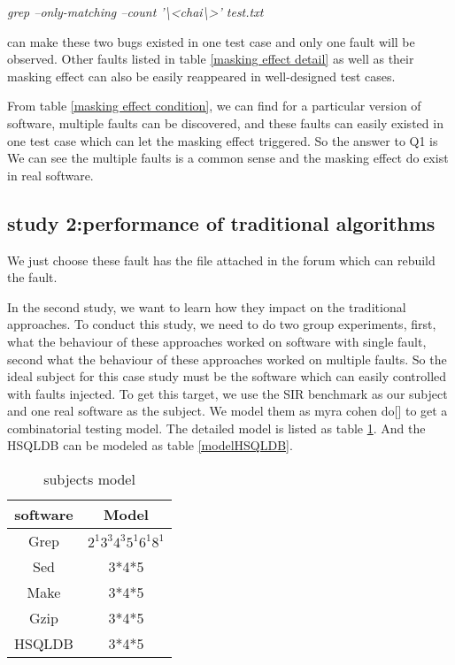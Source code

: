 \documentclass{sig-alternate}
\begin{document}
\emph{grep --only-matching --count '\textbackslash<chai\textbackslash>' test.txt} 

can make these two bugs existed in one test case and only one fault will be observed. Other faults listed in table \ref{masking effect detail} as well as their masking effect can also be easily reappeared in well-designed test cases.

From table \ref{masking effect condition}, we can find for a particular version of software, multiple faults can be discovered, and these faults can easily existed in one test case which can let the masking effect triggered. So the answer to Q1 is We can see the multiple faults is a common sense and the masking effect do exist in real software.

\subsection{study 2:performance of traditional algorithms}
We just choose these fault has the file attached in the forum which can rebuild the fault.

In the second study, we want to learn how they impact on the traditional approaches. To conduct this study, we need to do two group experiments, first, what the behaviour of these approaches worked on software with single fault, second what the behaviour of these approaches worked on multiple faults. So the ideal subject for this case study must be the software which can easily controlled with faults injected. To get this target, we use the SIR benchmark as our subject and one real software as the subject. We model them as myra cohen do[] to get a combinatorial testing model.  The detailed model is listed as table \ref{subject_model}. And the HSQLDB can be modeled as table \ref{modelHSQLDB}.

\begin{table}\renewcommand{\arraystretch}{1.3}
\caption{subjects model}
\label{subject_model}
\begin{tabular}{c|c} \hline
software & Model  \\ \hline
Grep & $2^{1}3^{3}4^{3}5^{1}6^{1}8^{1}$ \\ \hline
Sed &  3*4*5 \\ \hline
Make & 3*4*5 \\ \hline
Gzip & 3*4*5 \\ \hline
HSQLDB & 3*4*5 \\
\hline\end{tabular}
\end{table}
\end{document}
